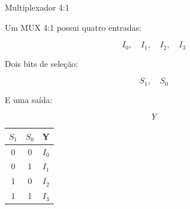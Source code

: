 \begin{frame}{Multiplexador 4:1}

    Um MUX 4:1 possui quatro entradas:

    \[
        I_0,\quad I_1,\quad I_2,\quad I_3
    \]

    Dois bits de seleção:

    \[
        S_1,\quad S_0
    \]

    E uma saída:

    \[
        Y
    \]

    \begin{center}
        \begin{tabular}{c c | c}
            \hline
            $S_1$ & $S_0$ & Y \\
            \hline
            0 & 0 & $I_0$ \\
            0 & 1 & $I_1$ \\
            1 & 0 & $I_2$ \\
            1 & 1 & $I_3$ \\
            \hline
        \end{tabular}
    \end{center}

\end{frame}